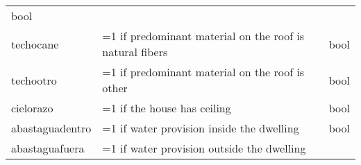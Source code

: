 \documentclass[11pt]{article}
\begin{document}
\begin{longtable}[]{@{}lll@{}}
\begin{minipage}[t]{0.24\columnwidth}
bool\strut
\end{minipage}\tabularnewline
\begin{minipage}[t]{0.19\columnwidth}\raggedright\strut
techocane\strut
\end{minipage} & \begin{minipage}[t]{0.16\columnwidth}\raggedright\strut
=1 if predominant material on the roof is natural fibers\strut
\end{minipage} & \begin{minipage}[t]{0.24\columnwidth}\raggedright\strut
bool\strut
\end{minipage}\tabularnewline
\begin{minipage}[t]{0.19\columnwidth}\raggedright\strut
techootro\strut
\end{minipage} & \begin{minipage}[t]{0.16\columnwidth}\raggedright\strut
=1 if predominant material on the roof is other\strut
\end{minipage} & \begin{minipage}[t]{0.24\columnwidth}\raggedright\strut
bool\strut
\end{minipage}\tabularnewline
\begin{minipage}[t]{0.19\columnwidth}\raggedright\strut
cielorazo\strut
\end{minipage} & \begin{minipage}[t]{0.16\columnwidth}\raggedright\strut
=1 if the house has ceiling\strut
\end{minipage} & \begin{minipage}[t]{0.24\columnwidth}\raggedright\strut
bool\strut
\end{minipage}\tabularnewline
\begin{minipage}[t]{0.19\columnwidth}\raggedright\strut
abastaguadentro\strut
\end{minipage} & \begin{minipage}[t]{0.16\columnwidth}\raggedright\strut
=1 if water provision inside the dwelling\strut
\end{minipage} & \begin{minipage}[t]{0.24\columnwidth}\raggedright\strut
bool\strut
\end{minipage}\tabularnewline
\begin{minipage}[t]{0.19\columnwidth}\raggedright\strut
abastaguafuera\strut
\end{minipage} & \begin{minipage}[t]{0.16\columnwidth}\raggedright\strut
=1 if water provision outside the dwelling\strut

\end{minipage}
\end{longtable}
\end{document}
